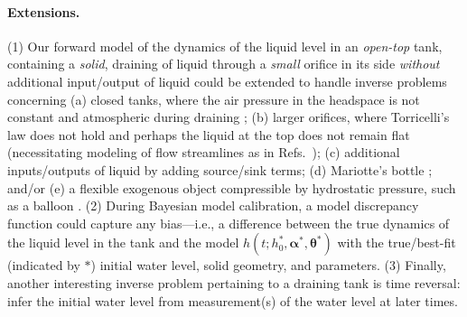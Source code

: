 \documentclass[a4paper,fleqn]{cas-dc}
\begin{document}
\paragraph{Extensions.}
(1) Our forward model of the dynamics of the liquid level in an \emph{open-top} tank, containing a \emph{solid}, draining of liquid through a \emph{small} orifice in its side \emph{without} additional input/output of liquid could be extended to handle inverse problems concerning
(a) closed tanks, where the air pressure in the headspace is not constant and atmospheric during draining \cite{cross2016filling}; 
(b) larger orifices, where Torricelli's law does not hold and perhaps the liquid at the top does not remain flat (necessitating modeling of flow streamlines as in Refs.~\cite{mathew2014numerical,sakri2017numerical});
(c) additional inputs/outputs of liquid by adding source/sink terms; 
(d) Mariotte's bottle \cite{kirevs2006mariotte}; and/or
(e) a flexible exogenous object compressible by hydrostatic pressure, such as a balloon \cite{muller2004rubber}. 
(2) During Bayesian model calibration, a model discrepancy \cite{brynjarsdottir2014learning,kennedy2001bayesian,eugene2023learning} function could capture any bias---i.e., a difference between the true dynamics of the liquid level in the tank and the model $h(t; h_0^*,  \boldsymbol \alpha^*, \boldsymbol \theta^*)$ with the true/best-fit (indicated by $*$) initial water level, solid geometry, and parameters.
(3) Finally, another interesting inverse problem pertaining to a draining tank is time reversal: infer the initial water level from measurement(s) of the water level at later times.
\end{document}
